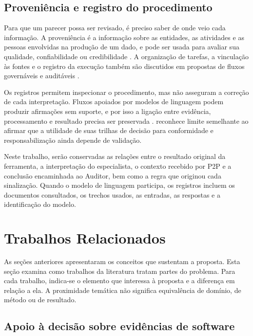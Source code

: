 \subsection{Proveniência e registro do procedimento}
\label{rt-2-5-3}

Para que um parecer possa ser revisado, é preciso saber de onde veio cada informação. A proveniência é a informação sobre as entidades, as atividades e as pessoas envolvidas na produção de um dado, e pode ser usada para avaliar sua qualidade, confiabilidade ou credibilidade \cite{groth2013}. A organização de tarefas, a vinculação às fontes e o registro da execução também são discutidos em propostas de fluxos governáveis e auditáveis \cite{rousek2026}.

Os registros permitem inspecionar o procedimento, mas não asseguram a correção de cada interpretação. Fluxos apoiados por modelos de linguagem podem produzir afirmações sem suporte, e por isso a ligação entre evidência, processamento e resultado precisa ser preservada \cite{rousek2026}.  reconhece limite semelhante ao afirmar que a utilidade de suas trilhas de decisão para conformidade e responsabilização ainda depende de validação.

Neste trabalho, serão conservadas as relações entre o resultado original da ferramenta, a interpretação do especialista, o contexto recebido por P2P e a conclusão encaminhada ao Auditor, bem como a regra que originou cada sinalização. Quando o modelo de linguagem participa, os registros incluem os documentos consultados, os trechos usados, as entradas, as respostas e a identificação do modelo.

\section{Trabalhos Relacionados}
\label{rt-2-6}

As seções anteriores apresentaram os conceitos que sustentam a proposta. Esta seção examina como trabalhos da literatura tratam partes do problema. Para cada trabalho, indica-se o elemento que interessa à proposta e a diferença em relação a ela. A proximidade temática não significa equivalência de domínio, de método ou de resultado.

\subsection{Apoio à decisão sobre evidências de software}
\label{rt-2-6-1}

